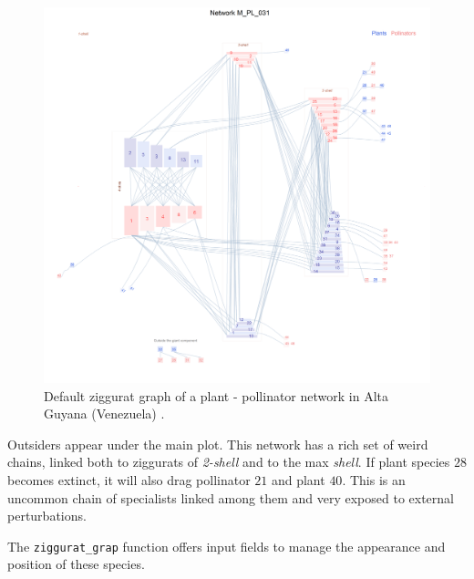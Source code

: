 \documentclass[12pt]{article}
\begin{document}
\clearpage
\begin{figure}[hp!]
\centering
\includegraphics[scale=0.45]{M_PL_031_ziggurat.png}
\caption {Default ziggurat graph of a plant - pollinator network in Alta Guyana (Venezuela) \cite{ramirez1989biologia}.}
\label{fig:KMAN_ziggurat_031}
\end{figure}

Outsiders appear under the main plot. This network has a rich set of weird chains, linked both to ziggurats of \textit{2-shell} and to the
max \textit{shell}. If plant species $28$ becomes extinct, it will also drag pollinator $21$ and plant $40$. This is an uncommon chain of
specialists linked among them and very exposed to external perturbations.

The \texttt{ziggurat\_grap} function offers input fields to manage the appearance and position of these species.
\end{document}
